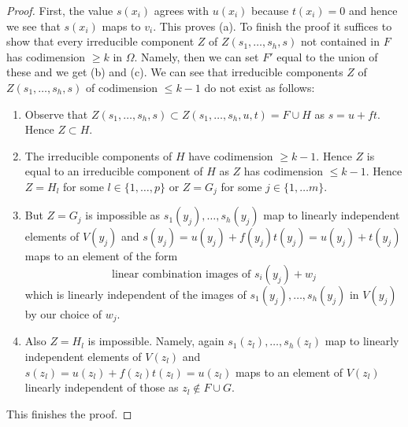 \documentclass[10pt,a4paper]{amsart}
\theoremstyle{plain}
\theoremstyle{definition}
\theoremstyle{remark}
\numberwithin{equation}{subsection}
\begin{document}
\begin{proof}
\medskip\noindent
First, the value $s(x_i)$ agrees with $u(x_i)$ because
$t(x_i) = 0$ and hence we see that $s(x_i)$ maps to $v_i$.
This proves (a).
To finish the proof it suffices to show that every irreducible
component $Z$ of $Z(s_1, \ldots, s_h, s)$ not contained in $F$
has codimension $\geq k$ in $\Omega$. Namely, then we can set $F'$
equal to the union of these and we get (b) and (c).
We can see that irreducible components $Z$ of $Z(s_1, \ldots, s_h, s)$
of codimension $\leq k - 1$ do not exist as follows:
\begin{enumerate}
\item Observe that
$Z(s_1, \ldots, s_h, s) \subset Z(s_1, \ldots, s_h, u, t) = F \cup H$
as $s = u + ft$. Hence $Z \subset H$.
\item The irreducible components of $H$ have codimension $\geq k - 1$.
Hence $Z$ is equal to an irreducible component of $H$
as $Z$ has codimension $\leq k - 1$.
Hence $Z = H_l$ for some $l \in \{1, \ldots, p\}$ or
$Z = G_j$ for some $j \in \{1, \ldots m\}$.
\item But $Z = G_j$ is impossible as $s_1(y_j), \ldots, s_h(y_j)$
map to linearly independent elements of $V(y_j)$ and
$s(y_j) = u(y_j) + f(y_j) t(y_j) = u(y_j) + t(y_j)$
maps to an element of the form
$$
\text{linear combination images of }s_i(y_j) + w_j
$$
which is linearly independent of the images of $s_1(y_j), \ldots, s_h(y_j)$
in $V(y_j)$ by our choice of $w_j$.
\item Also $Z = H_l$ is impossible. Namely, again
$s_1(z_l), \ldots, s_h(z_l)$ map to linearly independent
elements of $V(z_l)$ and $s(z_l) = u(z_l) + f(z_l) t(z_l) = u(z_l)$
maps to an element of $V(z_l)$ linearly independent of those
as $z_l \not \in F \cup G$.
\end{enumerate}
This finishes the proof.
\end{proof}
\end{document}
